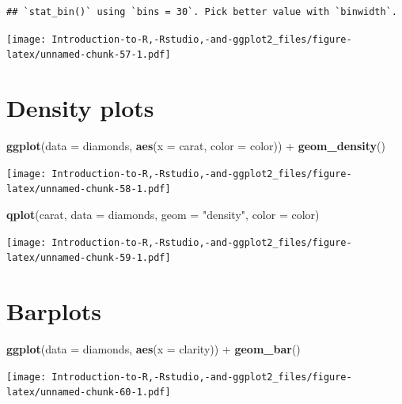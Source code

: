 \documentclass[]{book}
\newenvironment{Shaded}{\begin{snugshade}}{\end{snugshade}}
\newcommand{\KeywordTok}[1]{\textcolor[rgb]{0.13,0.29,0.53}{\textbf{{#1}}}}
\newcommand{\DataTypeTok}[1]{\textcolor[rgb]{0.13,0.29,0.53}{{#1}}}
\newcommand{\StringTok}[1]{\textcolor[rgb]{0.31,0.60,0.02}{{#1}}}
\newcommand{\NormalTok}[1]{{#1}}
\begin{document}
\begin{verbatim}
## `stat_bin()` using `bins = 30`. Pick better value with `binwidth`.
\end{verbatim}

\texttt{[image: Introduction-to-R,-Rstudio,-and-ggplot2\_files/figure-latex/unnamed-chunk-57-1.pdf]}

\section{Density plots}\label{density-plots}

\begin{Shaded}
\begin{Highlighting}[]
\KeywordTok{ggplot}\NormalTok{(}\DataTypeTok{data =} \NormalTok{diamonds, }\KeywordTok{aes}\NormalTok{(}\DataTypeTok{x =} \NormalTok{carat, }\DataTypeTok{color =} \NormalTok{color)) +}\StringTok{ }\KeywordTok{geom_density}\NormalTok{() }
\end{Highlighting}
\end{Shaded}

\texttt{[image: Introduction-to-R,-Rstudio,-and-ggplot2\_files/figure-latex/unnamed-chunk-58-1.pdf]}

\begin{Shaded}
\begin{Highlighting}[]
\KeywordTok{qplot}\NormalTok{(carat, }\DataTypeTok{data =} \NormalTok{diamonds, }\DataTypeTok{geom =} \StringTok{"density"}\NormalTok{, }\DataTypeTok{color =} \NormalTok{color)}
\end{Highlighting}
\end{Shaded}

\texttt{[image: Introduction-to-R,-Rstudio,-and-ggplot2\_files/figure-latex/unnamed-chunk-59-1.pdf]}

\section{Barplots}\label{barplots}

\begin{Shaded}
\begin{Highlighting}[]
\KeywordTok{ggplot}\NormalTok{(}\DataTypeTok{data =} \NormalTok{diamonds, }\KeywordTok{aes}\NormalTok{(}\DataTypeTok{x =} \NormalTok{clarity)) +}\StringTok{ }\KeywordTok{geom_bar}\NormalTok{() }
\end{Highlighting}
\end{Shaded}

\texttt{[image: Introduction-to-R,-Rstudio,-and-ggplot2\_files/figure-latex/unnamed-chunk-60-1.pdf]}
\end{document}
